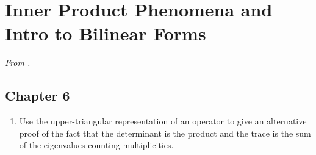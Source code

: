 \documentclass[../psets.tex]{subfiles}
\begin{document}
\section{Inner Product Phenomena and Intro to Bilinear Forms}
\emph{From \textcite{bib:Treil}.}
\subsection*{Chapter 6}
\begin{enumerate}[label={\textbf{1.\arabic*.}}]
    \item {}Use the upper-triangular representation of an operator to give an alternative proof of the fact that the determinant is the product and the trace is the sum of the eigenvalues counting multiplicities.
\end{enumerate}
\end{document}
